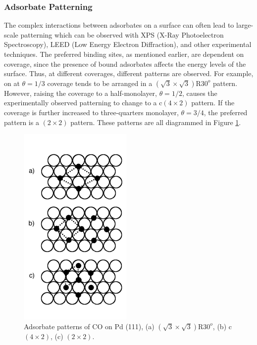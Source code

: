 \subsubsection{Adsorbate Patterning}
The complex interactions between adsorbates on a surface can often lead to
large-scale patterning which can be observed with XPS (X-Ray Photoelectron
Spectroscopy), LEED (Low Energy Electron Diffraction), and other experimental
techniques. The preferred binding sites, as mentioned earlier, are dependent on
coverage, since the presence of bound adsorbates affects the energy levels of
the surface. Thus, at different coverages, different patterns are observed. For
example,  on  at $\theta = 1/3$ coverage tends to be
arranged in a $(\sqrt{3}\times\sqrt{3})\textrm{R}30^o$ pattern. However, raising the coverage to a
half-monolayer, $\theta = 1/2$, causes the experimentally observed patterning to change to a c$(4\times2)$
pattern. If the coverage is further increased to three-quarters monolayer, $\theta = 3/4$, 
the preferred pattern is a $(2\times2)$ pattern.\citep{Guo:1989} These patterns are
all diagrammed in Figure \ref{fig:patterns}.

\begin{figure}[p!]
\centering
  \includegraphics[width=0.5\linewidth]{../figures/chap1/pattern.pdf}
  \caption{Adsorbate patterns of CO on Pd (111), (a)
$(\sqrt{3}\times\sqrt{3})\textrm{R}30^o$, (b) c$(4\times2)$, (c) $(2\times2)$.}
\label{fig:patterns}
\end{figure}

